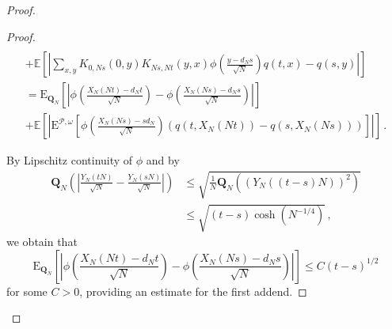 \documentclass[a4paper,11pt,oneside,reqno]{amsart}
\theoremstyle{definition}
\renewcommand{\leq}{\leqslant}
\numberwithin{equation}{section}
\begin{document}
\begin{proof}
\begin{proof}
{\begin{multline*}
							\\+
							\mathbb{E}\left[\left|\sum_{x,y}K_{0,Ns}(0,y)K_{Ns,Nt}(y,x)\phi\left(\frac{y-d_{N}s}{\sqrt{N}}\right)q(t,x)-q(s,y)\right|\right]
							\\=
							\mathrm{E}_{\mathbf Q_{N}}\left[\left|\phi\left(\frac{X_{N}(Nt)-d_{N}t}{\sqrt{N}}\right)-\phi\left(\frac{X_{N}(Ns)-d_{N}s}{\sqrt{N}}\right)\right|\right]
							\\ +
							\mathbb{E}\left[\left|\mathrm{E}^{\mathcal{P},\omega}\left[\phi\left(\frac{X_{N}(Ns)-sd_{N}}{\sqrt{N}}\right)\left(q(t,X_{N}(Nt))-q(s,X_{N}(Ns))\right)\right]\right|\right]\,.
					\end{multline*}
					
					By Lipschitz continuity of $\phi$ and by 
					\begin{align*} \mathbf{Q}_{N}\left(\left|\frac{Y_{N}(tN)}{\sqrt{N}}-\frac{Y_{N}(sN)}{\sqrt{N}}\right|\right) &\leq \sqrt{ \frac{1}{N} \mathbf{Q}_{N}\left(\left(Y_{N}((t-s)N)\right)^2\right) }\\
						&\leq \sqrt{(t-s) \cosh(N^{-1/4})}\,,
						 \end{align*}
						 we obtain that 
						 $$
						 \mathrm{E}_{\mathbf Q_{N}}\left[\left|\phi\left(\frac{X_{N}(Nt)-d_{N}t}{\sqrt{N}}\right)-\phi\left(\frac{X_{N}(Ns)-d_{N}s}{\sqrt{N}}\right)\right|\right]\leq C(t-s)^{1/2}
						 $$
					for some $C>0$,	providing an estimate for the first addend. 
					
}
\end{proof}
\end{proof}
\end{document}
